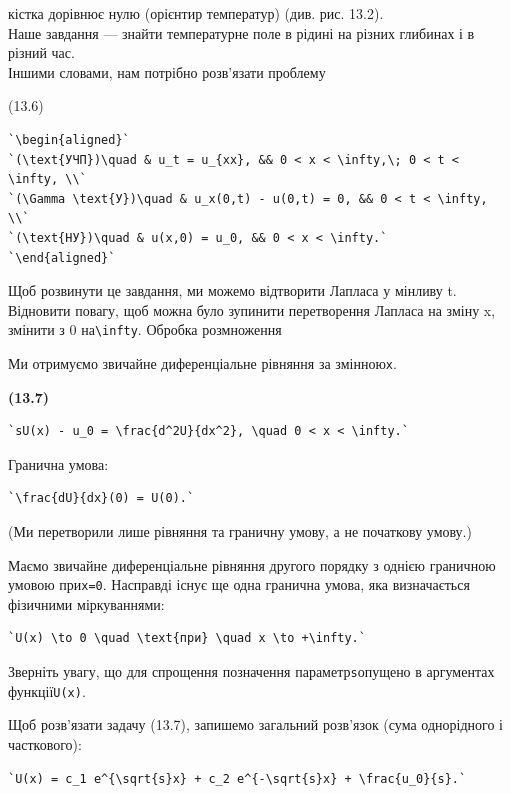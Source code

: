 \documentclass[
  ukrainian,
]{article}
\begin{document}
кістка дорівнює нулю (орієнтир температур) (див. рис. 13.2).\\
Наше завдання --- знайти температурне поле в рідині на різних глибинах і
в різний час.\\
Іншими словами, нам потрібно розв'язати проблему

(13.6)

\begin{verbatim}
`\begin{aligned}`
`(\text{УЧП})\quad & u_t = u_{xx}, && 0 < x < \infty,\; 0 < t < \infty, \\`
`(\Gamma \text{У})\quad & u_x(0,t) - u(0,t) = 0, && 0 < t < \infty, \\`
`(\text{НУ})\quad & u(x,0) = u_0, && 0 < x < \infty.`
`\end{aligned}`
\end{verbatim}

Щоб розвинути це завдання, ми можемо відтворити Лапласа у мінливу t.
Відновити повагу, щоб можна було зупинити перетворення Лапласа на зміну
x, змінити з 0 на\texttt{\textbackslash{}infty}. Обробка розмноження

Ми отримуємо звичайне диференціальне рівняння за змінною\texttt{x}.

\textbf{(13.7)}

\begin{verbatim}
`sU(x) - u_0 = \frac{d^2U}{dx^2}, \quad 0 < x < \infty.`
\end{verbatim}

Гранична умова:

\begin{verbatim}
`\frac{dU}{dx}(0) = U(0).`
\end{verbatim}

(Ми перетворили лише рівняння та граничну умову, а не початкову умову.)

Маємо звичайне диференціальне рівняння другого порядку з однією
граничною умовою при\texttt{x=0}. Насправді існує ще одна гранична
умова, яка визначається фізичними міркуваннями:

\begin{verbatim}
`U(x) \to 0 \quad \text{при} \quad x \to +\infty.`
\end{verbatim}

Зверніть увагу, що для спрощення позначення параметр\texttt{s}опущено в
аргументах функції\texttt{U(x)}.

Щоб розв'язати задачу (13.7), запишемо загальний розв'язок (сума
однорідного і часткового):

\begin{verbatim}
`U(x) = c_1 e^{\sqrt{s}x} + c_2 e^{-\sqrt{s}x} + \frac{u_0}{s}.`
\end{verbatim}
\end{document}
